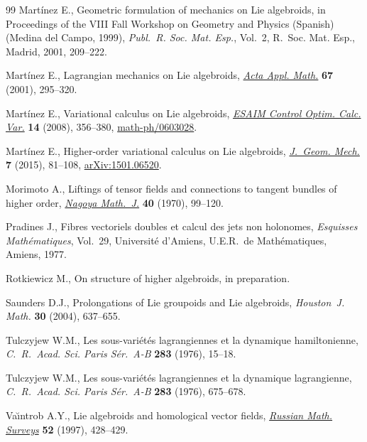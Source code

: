 \documentclass[10pt,a4paper]{amsart}
\numberwithin{equation}{section}
\theoremstyle{definition}
\begin{document}
\begin{thebibliography}{99}
Mart\'{i}nez E., Geometric formulation of mechanics on {L}ie algebroids, in
 Proceedings of the {VIII} {F}all {W}orkshop on {G}eometry and {P}hysics
 ({S}panish) ({M}edina del {C}ampo, 1999), \textit{Publ.~R. Soc. Mat. Esp.},
 Vol.~2, R.~Soc. Mat. Esp., Madrid, 2001, 209--222.

Mart\'{i}nez E., Lagrangian mechanics on {L}ie algebroids, \href{https://doi.org/10.1023/A:1011965919259}{\textit{Acta Appl.
 Math.}} \textbf{67} (2001), 295--320.

Mart\'{i}nez E., Variational calculus on {L}ie algebroids, \href{https://doi.org/10.1051/cocv:2007056}{\textit{ESAIM
 Control Optim. Calc. Var.}} \textbf{14} (2008), 356--380,
 \href{https://arxiv.org/abs/math-ph/0603028}{math-ph/0603028}.

Mart\'{i}nez E., Higher-order variational calculus on {L}ie algebroids,
 \href{https://doi.org/10.3934/jgm.2015.7.81}{\textit{J.~Geom. Mech.}} \textbf{7} (2015), 81--108, \href{https://arxiv.org/abs/1501.06520}{arXiv:1501.06520}.

Morimoto A., Liftings of tensor fields and connections to tangent bundles of
 higher order, \href{https://doi.org/10.1017/S002776300001388X}{\textit{Nagoya Math.~J.}} \textbf{40} (1970), 99--120.

Pradines J., Fibres vectoriels doubles et calcul des jets non holonomes,
 \textit{Esquisses Math\'{e}matiques}, Vol.~29,
 Universit\'{e} d'Amiens, U.E.R.~de Math\'{e}matiques, Amiens, 1977.

Rotkiewicz M., On structure of higher algebroids, {i}n preparation.

Saunders D.J., Prolongations of {L}ie groupoids and {L}ie algebroids,
 \textit{Houston~J. Math.} \textbf{30} (2004), 637--655.

Tulczyjew W.M., Les sous-vari\'{e}t\'{e}s lagrangiennes et la dynamique
 hamiltonienne, \textit{C.~R.~Acad. Sci. Paris S\'{e}r.~A-B} \textbf{283}
 (1976), 15--18.

Tulczyjew W.M., Les sous-vari\'{e}t\'{e}s lagrangiennes et la dynamique
 lagrangienne, \textit{C.~R.~Acad. Sci. Paris S\'{e}r.~A-B} \textbf{283}
 (1976), 675--678.

Va\u{\i}ntrob A.Y., Lie algebroids and homological vector fields,
 \href{https://doi.org/10.1070/RM1997v052n02ABEH001802}{\textit{Russian Math. Surveys}} \textbf{52} (1997), 428--429.


\end{thebibliography}
\end{document}
